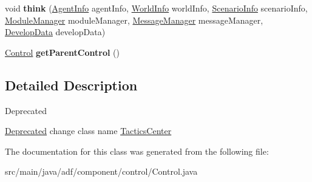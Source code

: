 \begin{DoxyCompactItemize}
\item 
\hypertarget{classadf_1_1component_1_1control_1_1Control_ad8d7e05c1d5e6ac44e50c79a3ab14706}{}\label{classadf_1_1component_1_1control_1_1Control_ad8d7e05c1d5e6ac44e50c79a3ab14706} 
void {\bfseries think} (\hyperlink{classadf_1_1agent_1_1info_1_1AgentInfo}{Agent\+Info} agent\+Info, \hyperlink{classadf_1_1agent_1_1info_1_1WorldInfo}{World\+Info} world\+Info, \hyperlink{classadf_1_1agent_1_1info_1_1ScenarioInfo}{Scenario\+Info} scenario\+Info, \hyperlink{classadf_1_1agent_1_1module_1_1ModuleManager}{Module\+Manager} module\+Manager, \hyperlink{classadf_1_1agent_1_1communication_1_1MessageManager}{Message\+Manager} message\+Manager, \hyperlink{classadf_1_1agent_1_1develop_1_1DevelopData}{Develop\+Data} develop\+Data)
\item 
\hypertarget{classadf_1_1component_1_1control_1_1Control_adccbe65c8b9e73ebb17d8dd53273f41d}{}\label{classadf_1_1component_1_1control_1_1Control_adccbe65c8b9e73ebb17d8dd53273f41d} 
\hyperlink{classadf_1_1component_1_1control_1_1Control}{Control} {\bfseries get\+Parent\+Control} ()
\end{DoxyCompactItemize}


\subsection{Detailed Description}
\begin{DoxyRefDesc}{Deprecated}
\item[\hyperlink{deprecated__deprecated000009}{Deprecated}]change class name \hyperlink{}{Tactics\+Center} \end{DoxyRefDesc}


The documentation for this class was generated from the following file\+:\begin{DoxyCompactItemize}
\item 
src/main/java/adf/component/control/Control.\+java\end{DoxyCompactItemize}
